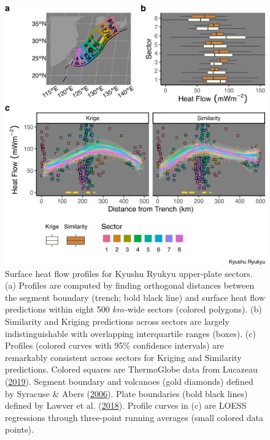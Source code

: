 \begin{figure}[htbp]

{\centering \includegraphics[width=1\linewidth,]{assets/figs/chpt3/kyushuRyukyuUpperPlate} 

}

\caption[Surface heat flow profiles for Kyushu Ryukyu upper-plate sectors]{Surface heat flow profiles for Kyushu Ryukyu upper-plate sectors. (a) Profiles are computed by finding orthogonal distances between the segment boundary (trench; bold black line) and surface heat flow predictions within eight 500 \(km\)-wide sectors (colored polygons). (b) Similarity and Kriging predictions across sectors are largely indistinguishable with overlapping interquartile ranges (boxes). (c) Profiles (colored curves with 95\% confidence intervals) are remarkably consistent across sectors for Kriging and Similarity predictions. Colored squares are ThermoGlobe data from Lucazeau (\protect\hyperlink{ref-lucazeau2019}{2019}). Segment boundary and volcanoes (gold diamonds) defined by Syracuse \& Abers (\protect\hyperlink{ref-syracuse2006}{2006}). Plate boundaries (bold black lines) defined by Lawver et al. (\protect\hyperlink{ref-lawver2018}{2018}). Profile curves in (c) are LOESS regressions through three-point running averages (small colored data points).}\label{fig:kyushuRyukyuUpper}
\end{figure}

